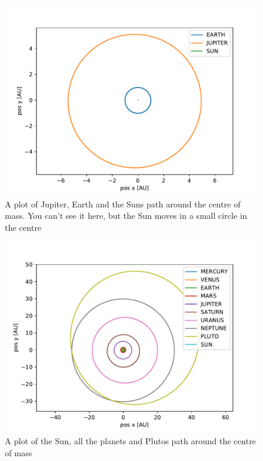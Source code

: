 \documentclass[a4paper]{article}
\begin{document}
\begin{figure}[h!]
	\centering 
	\includegraphics[scale=0.7]{../opp_f0.pdf}
	\caption{A plot of Jupiter, Earth and the Suns path around the centre of mass. You can't see it here, but the Sun moves in a small circle in the centre}
	\label{f_0}
\end{figure}
\begin{figure}[h!]
	\centering 
	\includegraphics[scale=0.7]{../opp_f1.pdf}
	\caption{A plot of the Sun, all the planets and Plutos path around the centre of mass}
	\label{f_1_0}
\end{figure}
\end{document}
